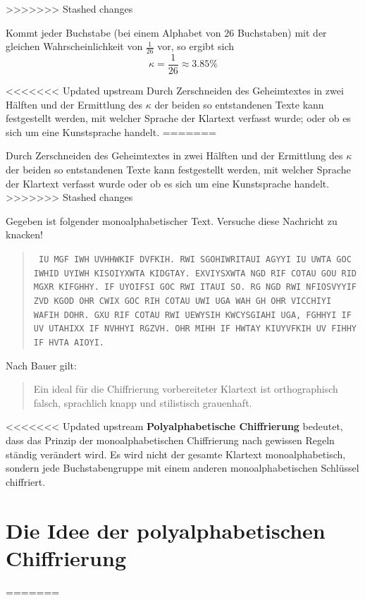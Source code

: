 \documentclass[%
<<<<<<< Updated upstream
11pt,%
twoside,%
titlepage,%
german,%
headsepline%
]{scrartcl}
\begin{document}
>>>>>>> Stashed changes
\begin{bem}
Kommt jeder Buchstabe (bei einem Alphabet von $26$ Buchstaben) mit der gleichen Wahrscheinlichkeit von $\frac{1}{26}$ vor, so ergibt sich
$$\kappa=\frac{1}{26}\approx3.85\%$$
\end{bem}
<<<<<<< Updated upstream
Durch Zerschneiden des Geheimtextes in zwei Hälften und der Ermittlung des $\kappa$ der beiden so entstandenen Texte kann festgestellt werden, mit welcher Sprache der Klartext verfasst wurde; oder ob es sich um eine Kunstsprache handelt.
=======

Durch Zerschneiden des Geheimtextes in zwei Hälften und der Ermittlung des $\kappa$ der beiden so entstandenen Texte kann festgestellt werden, mit welcher Sprache der Klartext verfasst wurde oder ob es sich um eine Kunstsprache handelt.
>>>>>>> Stashed changes

Gegeben ist folgender monoalphabetischer Text. Versuche diese Nachricht zu knacken!

\begin{quote}
\texttt{
IU MGF IWH UVHHWKIF DVFKIH. RWI SGOHIWRITAUI AGYYI IU UWTA GOC IWHID UYIWH KISOIYXWTA KIDGTAY. EXVIYSXWTA NGD RIF COTAU GOU RID MGXR KIFGHHY. IF UYOIFSI GOC RWI ITAUI SO. RG NGD RWI NFIOSVYYIF ZVD KGOD OHR CWIX GOC RIH COTAU UWI UGA WAH GH OHR VICCHIYI WAFIH DOHR. GXU RIF COTAU RWI UEWYSIH KWCYSGIAHI UGA, FGHHYI IF UV UTAHIXX IF NVHHYI RGZVH. OHR MIHH IF HWTAY KIUYVFKIH UV FIHHY IF HVTA AIOYI.}
\end{quote}
\normalfont

\begin{bem}
Nach Bauer gilt:
\begin{quote}
Ein ideal für die Chiffrierung vorbereiteter Klartext ist orthographisch falsch, sprachlich knapp und stilistisch grauenhaft.
\end{quote}
\end{bem}

<<<<<<< Updated upstream
\textbf{Polyalphabetische Chiffrierung} bedeutet, dass das Prinzip der monoalphabetischen Chiffrierung nach gewissen Regeln ständig verändert wird. Es wird nicht der gesamte Klartext monoalphabetisch, sondern jede Buchstabengruppe mit einem anderen monoalphabetischen Schlüssel chiffriert.

\clearpage

\section{Die Idee der polyalphabetischen Chiffrierung}
=======
\clearpage
\end{document}
